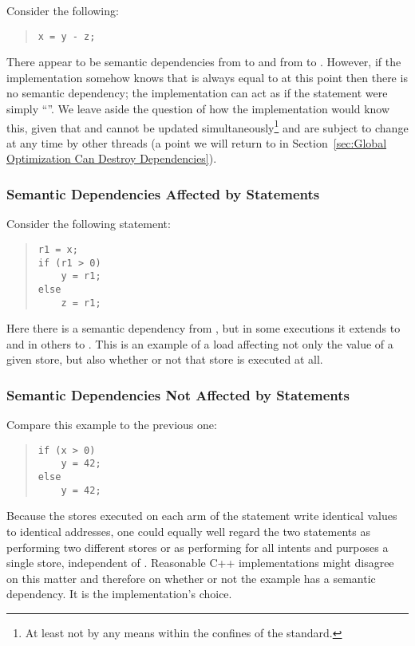 Consider the following:
\begin{quote}
\begin{verbatim}
x = y - z;
\end{verbatim}
\end{quote}
There appear to be semantic dependencies from  to  and from 
to .
However, if the implementation somehow knows that  is
always equal to  at this point then there is no semantic dependency;
the implementation can act as if the statement were simply ``''.
We leave aside the question of how the implementation would know this,
given that  and  cannot be updated simultaneously\footnote{
	At least not by any means within the confines of the standard.}
and are subject to change at any time by
other threads (a point we will return to in
Section~\ref{sec:Global Optimization Can Destroy Dependencies}).

\subsubsection{Semantic Dependencies Affected by  Statements}
\label{sec:Semantic Dependencies Affected by if Statements}

Consider the following  statement:
\begin{quote}
\begin{verbatim}
r1 = x;
if (r1 > 0)
    y = r1;
else
    z = r1;
\end{verbatim}
\end{quote}
Here there is a semantic dependency from , but in some executions
it extends to  and in others to .
This is an example of a load affecting not only the value of
a given store, but also whether or not that store is executed at all.

\subsubsection{Semantic Dependencies Not Affected by  Statements}
\label{sec:Semantic Dependencies Not Affected by if Statements}

Compare this example to the previous one:
\begin{quote}
\begin{verbatim}
if (x > 0)
    y = 42;
else
    y = 42;
\end{verbatim}
\end{quote}
Because the stores executed on each arm of the  statement write
identical values to identical addresses, one could equally well regard
the two statements as performing two different stores or as performing
for all intents and purposes a single store, independent of .
Reasonable C++ implementations might disagree on this matter and
therefore on whether or not the example has a semantic dependency.
It is the implementation's choice.

